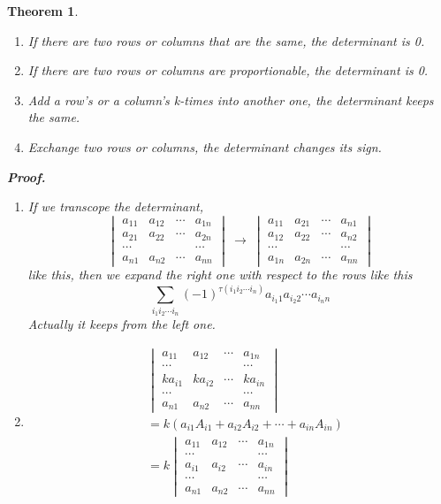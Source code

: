 \documentclass{article}
\newtheorem{theorem}{Theorem}[section]
\theoremstyle{definition}
\begin{document}
\begin{theorem}
\begin{enumerate}
$$\begin{vmatrix}
        \cdots &  &  & \cdots\\
        a_{n1} & a_{n2} & \cdots & a_{nn}
    \end{vmatrix}$$
    \item If there are two rows or columns that are the same, the determinant is 0.
    \item If there are two rows or columns are proportionable, the determinant is 0.
    \item Add a row's or a column's k-times into another one, the determinant keeps the same. 
    \item Exchange two rows or columns, the determinant changes its sign.
\end{enumerate}

\textbf{Proof.}
\begin{enumerate}
    \item 
If we transcope the determinant,
$$
\begin{vmatrix}
    a_{11} & a_{12} & \cdots & a_{1n}\\
    a_{21} & a_{22} & \cdots & a_{2n}\\
    \cdots &  &  & \cdots\\
    a_{n1} & a_{n2} & \cdots & a_{nn}
\end{vmatrix}
\ \rightarrow\ 
\begin{vmatrix}
    a_{11} & a_{21} & \cdots & a_{n1}\\
    a_{12} & a_{22} & \cdots & a_{n2}\\
    \cdots &  &  & \cdots\\
    a_{1n} & a_{2n} & \cdots & a_{nn}
\end{vmatrix}$$
like this, then we expand the right one with respect to the rows like this 
$$ \sum_{i_{1}i_{2}\cdots i_{n}}(-1)^{\tau (i_{1}i_{2}\cdots i_{n})} a_{i_{1}1}a_{i_{2}2}\cdots a_{i_{n}n}$$
Actually it keeps from the left one.\\

\item 
\begin{align*}
&\begin{vmatrix}
    a_{11} & a_{12} & \cdots & a_{1n}\\
    \cdots &  &  & \cdots\\
    ka_{i1} & ka_{i2} & \cdots & ka_{in}\\
    \cdots &  &  & \cdots\\
    a_{n1} & a_{n2} & \cdots & a_{nn}
\end{vmatrix}\\
& = k \left( a_{i1}A_{i1} + a_{i2}A_{i2} + \cdots + a_{in}A_{in} \right) \\
& = k \begin{vmatrix}
    a_{11} & a_{12} & \cdots & a_{1n}\\
    \cdots &  &  & \cdots\\
    a_{i1} & a_{i2} & \cdots & a_{in}\\
    \cdots &  &  & \cdots\\
    a_{n1} & a_{n2} & \cdots & a_{nn}
\end{vmatrix}
\end{align*}


\end{enumerate}
\end{theorem}
\end{document}
